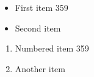 \documentclass{article}
\begin{document}
\begin{itemize}
\item First item 359
\item Second item
\end{itemize}
\begin{enumerate}
\item Numbered item 359
\item Another item
\end{enumerate}
\end{document}
